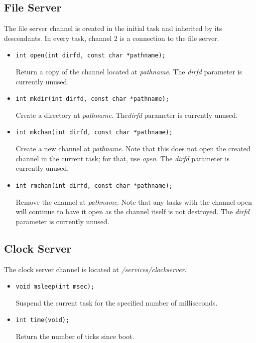\documentclass[letterpaper]{article}
\begin{document}
\subsection{File Server}
The file server channel is created in the initial task and inherited
by its descendants. In every task, channel 2 is a connection to the
file server.
\begin{itemize}
\item \begin{verbatim}int open(int dirfd, const char *pathname);\end{verbatim}
	Return a copy of the channel located at \emph{pathname}.
	The \emph{dirfd} parameter is currently unused.
\item \begin{verbatim}int mkdir(int dirfd, const char *pathname);\end{verbatim}
	Create a directory at \emph{pathname}.
	The\emph{dirfd} parameter is currently unused.
\item \begin{verbatim}int mkchan(int dirfd, const char *pathname);\end{verbatim}
	Create a new channel at \emph{pathname}. Note that this does not open
	the created channel in the current task; for that, use \emph{open}.
	The \emph{dirfd} parameter is currently unused.
\item \begin{verbatim}int rmchan(int dirfd, const char *pathname);\end{verbatim}
	Remove the channel at \emph{pathname}. Note that any tasks with the
	channel open will continue to have it open as the channel itself
	is not destroyed.
	The \emph{dirfd} parameter is currently unused.
\end{itemize}
\subsection{Clock Server}
The clock server channel is located at \emph{/services/clockserver}.
\begin{itemize}
\item \begin{verbatim}void msleep(int msec);\end{verbatim}
Suspend the current task for the specified number of milliseconds.
\item \begin{verbatim}int time(void);\end{verbatim}
Return the number of ticks since boot.
\end{itemize}
\end{document}
